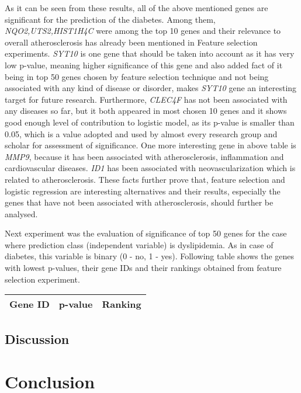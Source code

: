 \documentclass{ba-kecs}
\numberwithin{figure}{section}
\numberwithin{equation}{section}
\begin{document}
As it can be seen from these results, all of the above mentioned genes are significant for the prediction of the diabetes. Among them, \textit{NQO2,UTS2,HIST1H4C} were among the top 10 genes and their relevance to overall atherosclerosis has already been mentioned in Feature selection experiments. \textit{SYT10} is one gene that should be taken into account as it has very low p-value, meaning higher significance of this gene and also added fact of it being in top 50 genes chosen by feature selection technique and not being associated with any kind of disease or disorder, makes \textit{SYT10} gene an interesting target for future research. Furthermore, \textit{CLEC4F} has not been associated with any diseases so far, but it both appeared in most chosen 10 genes and it shows good enough level of contribution to logistic model, as its p-value is smaller than 0.05, which is a value adopted and used by almost every research group and scholar for assessment of significance. One more interesting gene in above table is \textit{MMP9}, because it has been associated with atherosclerosis, inflammation and cardiovascular diseases. \textit{ID1} has been associated with neovascularization which is related to atherosclerosis. These facts further prove that, feature selection and logistic regression are interesting alternatives and their results, especially the genes that have not been associated with atherosclerosis, should further be analysed.

Next experiment was the evaluation of significance of top 50 genes for the case where prediction class (independent variable) is dyslipidemia. As in case of diabetes, this variable is binary (0 - no, 1 - yes). Following table shows the genes with lowest p-values, their gene IDs and their rankings obtained from feature selection experiment.
\begin{center}
\begin{tabular}{|l|l|l|}
Gene ID & p-value & Ranking \\ \hline
\hline
\end{tabular}
\end{center}

\subsection{Discussion}

\section{Conclusion}
\end{document}
